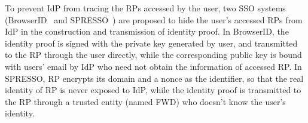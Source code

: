 To prevent IdP from tracing the RPs accessed by the user, two SSO systems (BrowserID~\cite{persona} and SPRESSO~\cite{SPRESSO}) are proposed to hide the user's accessed RPs from IdP in the construction and transmission of identity proof. In BrowserID, the identity proof is signed with the private key generated by user, and transmitted to the RP through the user directly,  while the corresponding  public key is bound with users' email by IdP who need not obtain the information of accessed RP. In SPRESSO, RP encrypts its domain and a nonce as the identifier, so that the real identity of RP is never exposed to IdP, while the identity proof is transmitted to the RP through a trusted entity (named FWD) who doesn't know the user's identity.




